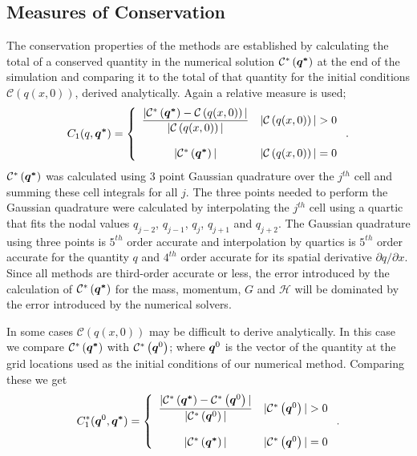\subsection{Measures of Conservation}
The conservation properties of the methods are established by calculating the total of a conserved quantity in the numerical solution $\mathcal{C}^*\left({\boldsymbol{q^*}}\right)$ at the end of the simulation and comparing it to the total of that quantity for the initial conditions $\mathcal{C}\left({q(x,0)} \right)$, derived analytically. Again a relative measure is used;
\begin{equation}
C_1(q,\boldsymbol{q^*}) =  \left\lbrace \begin{array}{c r} 
\dfrac{|\mathcal{C}^*\left({\boldsymbol{q^*}}\right) - \mathcal{C}\left({q(x,0)} \right)| }{|\mathcal{C}\left({q(x,0)} \right)|} & |\mathcal{C}\left({q(x,0)} \right)| > 0 \\ \\
|\mathcal{C}^*\left({\boldsymbol{q^*}}\right)| & |\mathcal{C}\left({q(x,0)} \right)| = 0  \end{array}\right. . 
\label{eqn:C1qdef} 
\end{equation}
$\mathcal{C}^*\left({\boldsymbol{q^*}}\right)$ was calculated using 3 point Gaussian quadrature over the $j^{th}$ cell and summing these cell integrals for all $j$. The three points needed to perform the Gaussian quadrature were calculated by interpolating the $j^{th}$ cell using a quartic that fits the nodal values $q_{j-2}$, $q_{j-1}$, $q_{j}$, $q_{j+1}$ and $q_{j+2}$. The Gaussian quadrature using three points is $5^{th}$ order accurate and interpolation by quartics is $5^{th}$ order accurate for the quantity $q$ and $4^{th}$ order accurate for its spatial derivative $\partial q /  \partial x$. Since all methods are third-order accurate or less, the error introduced by the calculation of $\mathcal{C}^*\left({\boldsymbol{q^*}}\right)$ for the mass, momentum, $G$ and $\mathcal{H}$ will be dominated by the error introduced by the numerical solvers.

In some cases $\mathcal{C}\left({q(x,0)} \right)$ may be difficult to derive analytically. In this case we compare $\mathcal{C}^*\left(\boldsymbol{q^*}\right)$ with $\mathcal{C}^*\left(\boldsymbol{q}^0\right)$; where $\boldsymbol{q}^0$ is the vector of the quantity at the grid locations used as the initial conditions of our numerical method. Comparing these we get 
\begin{equation}
C^*_1({\boldsymbol{q}^0},\boldsymbol{q^*}) =  \left\lbrace \begin{array}{c r} 
\dfrac{|\mathcal{C}^*\left({\boldsymbol{q^*}}\right) - \mathcal{C}^*\left({\boldsymbol{q}^0}\right)| }{|\mathcal{C}^*\left({\boldsymbol{q}^0}\right)|} & |\mathcal{C}^*\left({\boldsymbol{q}^0}\right)| > 0 \\ \\
|\mathcal{C}^*\left({\boldsymbol{q^*}}\right)| & |\mathcal{C}^*\left({\boldsymbol{q}^0}\right)| = 0  \end{array}\right. . 
\label{eqn:C*1qdef} 
\end{equation}


